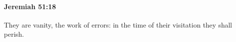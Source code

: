 
		\paragraph{Jeremiah 51:18} %
			\label{JEREMIAH-51-18}

			They are vanity, the work of errors: in the time of their visitation they shall perish.


